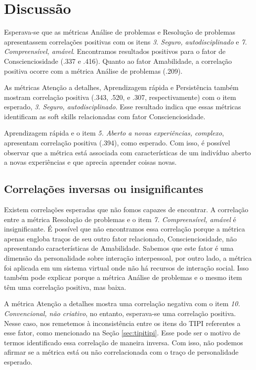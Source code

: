 \section{Discussão}
\label{sec:discussao}

Esperava-se que as métricas Análise de problemas e Resolução de problemas apresentassem correlações positivas com os itens \textit{3. Seguro, autodisciplinado} e \textit{7. Compreensível, amável}. Encontramos resultados positivos para o fator de Conscienciosidade (.337 e .416). Quanto ao fator Amabilidade, a correlação positiva ocorre com a métrica Análise de problemas (.209).

As métricas Atenção a detalhes, Aprendizagem rápida e Persistência também mostram correlação positiva (.343, .520, e .307, respectivamente) com o item esperado, \textit{3. Seguro, autodisciplinado}. Esse resultado indica que essas métricas identificam as soft skills relacionadas com fator Conscienciosidade.

Aprendizagem rápida e o item \textit{5. Aberto a novas experiências, complexo}, apresentam correlação positiva (.394), como esperado. Com isso, é possível observar que a métrica está associada com características de um indivíduo aberto a novas experiências e que aprecia aprender coisas novas.

\subsection{Correlações inversas ou insignificantes}

Existem correlações esperadas que não fomos capazes de encontrar. A correlação entre a métrica Resolução de problemas e o item \textit{7. Compreensível, amável} é insignificante. É possível que não encontramos essa correlação porque a métrica apenas engloba traços de seu outro fator relacionado, Conscienciosidade, não apresentando características de Amabilidade. Sabemos que este fator é uma dimensão da personalidade sobre interação interpessoal, por outro lado, a métrica foi aplicada em um sistema virtual onde não há recursos de interação social. Isso também pode explicar porque a métrica Análise de problemas e o mesmo item têm uma correlação positiva, mas baixa.

A métrica Atenção a detalhes mostra uma correlação negativa com o item
\textit{10. Convencional, não criativo}, no entanto, esperava-se uma correlação positiva.
Nesse caso, nos remetemos à inconsistência entre os itens do TIPI referentes a esse fator, como mencionado na Seção \ref{sec:tipitipi}.
Esse pode ser o motivo de termos identificado essa correlação de maneira inversa.
Com isso, não podemos afirmar se a métrica está ou não correlacionada com o traço de personalidade esperado.

